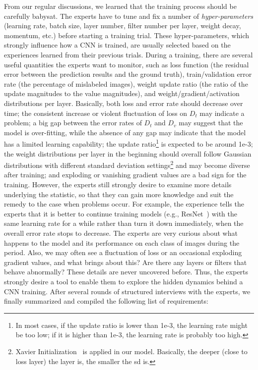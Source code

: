 \documentclass[format=acmsmall, review=false, screen=true]{acmart}
\begin{document}
From our regular discussions, we learned that the training process should be carefully babysat. The experts have to tune and fix a number of \textit{hyper-parameters} (learning rate, batch size, layer number, filter number per layer, weight decay, momentum, etc.) before starting a training trial.
These hyper-parameters, which strongly influence how a CNN is trained, are usually selected based on the experiences learned from their previous trials.
During a training, there are several useful quantities the experts want to monitor, such as loss function (the residual error between the prediction results and the ground truth), train/validation error rate (the percentage of mislabeled images), weight update ratio (the ratio of the update magnitudes to the value magnitudes), and weight/gradient/activation distributions per layer. Basically, both loss and error rate should decrease over time; the consistent increase or violent fluctuation of loss on $D_t$ may indicate a problem; a big gap between the error rates of $D_t$ and $D_v$ may suggest that the model is over-fitting, while the absence of any gap may indicate that the model has a limited learning capability; the update ratio\footnote{In most cases, if the update ratio is lower than 1e-3, the learning rate might be too low; if it is higher than 1e-3, the learning rate is probably too high.} is expected to be around 1e-3; the weight distributions per layer in the beginning should overall follow Gaussian distributions with different standard deviation settings\footnote{\label{note7}Xavier Initialization~\cite{glorot2010understanding} is applied in our model. Basically, the deeper (close to loss layer) the layer is, the smaller the sd is.} and may become diverse after training; and exploding or vanishing gradient values are a bad sign for the training.
However, the experts still strongly desire to examine more details underlying the statistic, so that they can gain more knowledge and suit the remedy to the case when problems occur.
For example, the experience tells the experts that it is better to continue training models (e.g., ResNet~\cite{he2016deep}) with the same learning rate for a while rather than turn it down immediately, when the overall error rate stops to decrease. The experts are very curious about what happens to the model and its performance on each class of images during the period.
Also, we may often see a fluctuation of loss or an occasional exploding gradient values, and what brings about this? Are there any layers or filters that behave abnormally?
These details are never uncovered before.
Thus, the experts strongly desire a tool to enable them to explore the hidden dynamics behind a CNN training.
After several rounds of structured interviews with the experts, we finally summarized and compiled the following list of requirements:
\end{document}
